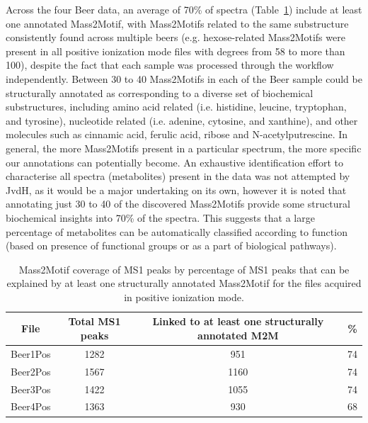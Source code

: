 Across the four Beer data, an average of 70\% of spectra (Table~\ref{tab:ms2lda-coverage}) include at least one annotated Mass2Motif, with Mass2Motifs related to the same substructure consistently found across multiple beers (e.g. hexose-related Mass2Motifs were present in all positive ionization mode files with degrees from 58 to more than 100), despite the fact that each sample was processed through the workflow independently. Between 30 to 40 Mass2Motifs in each of the Beer sample could be structurally annotated as corresponding to a diverse set of biochemical substructures, including amino acid related (i.e. histidine, leucine, tryptophan, and tyrosine), nucleotide related (i.e. adenine, cytosine, and xanthine), and other molecules such as cinnamic acid, ferulic acid, ribose and N-acetylputrescine. In general, the more Mass2Motifs present in a particular spectrum, the more specific our annotations can potentially become. An exhaustive identification effort to characterise all spectra (metabolites) present in the data was not attempted by JvdH, as it would be a major undertaking on its own, however it is noted that annotating just 30 to 40 of the discovered Mass2Motifs provide some structural biochemical insights into 70\% of the spectra. This suggests that a large percentage of metabolites can be automatically classified according to function (based on presence of functional groups or as a part of biological pathways). 

\begin{table}
\begin{centering}
\begin{tabular}{|c|c|c|c|}
\hline 
File & Total MS1 peaks & Linked to at least one structurally annotated M2M & \%\tabularnewline
\hline 
\hline 
Beer1Pos & 1282 & 951 & 74\tabularnewline
\hline 
Beer2Pos & 1567 & 1160 & 74\tabularnewline
\hline 
Beer3Pos & 1422 & 1055 & 74\tabularnewline
\hline 
Beer4Pos & 1363 & 930 & 68\tabularnewline
\hline 
\end{tabular}
\par\end{centering}
\caption{Mass2Motif coverage of MS1 peaks by percentage of MS1 peaks that can
be explained by at least one structurally annotated Mass2Motif for
the files acquired in positive ionization mode.\label{tab:ms2lda-coverage}}
\end{table}

